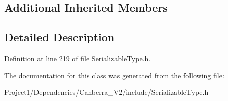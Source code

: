 \subsection*{Additional Inherited Members}


\subsection{Detailed Description}


Definition at line 219 of file Serializable\+Type.\+h.



The documentation for this class was generated from the following file\+:\begin{DoxyCompactItemize}
\item 
Project1/\+Dependencies/\+Canberra\+\_\+\+V2/include/Serializable\+Type.\+h\end{DoxyCompactItemize}
